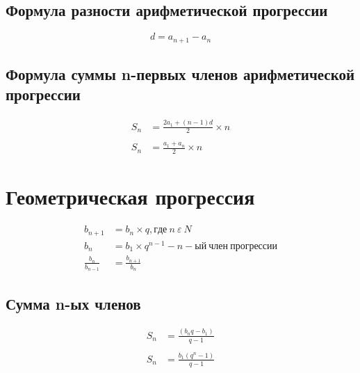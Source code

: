 \documentclass[a4paper,12pt]{article}
\begin{document}
\subsection{Формула разности арифметической прогрессии}

\[ d = a_{n+1} - a_{n} \]

\subsection{Формула суммы n-первых членов арифметической прогрессии}

\begin{align*}
S_{n} &= \frac{2a_{1} + (n - 1)d}{2} \times n \\ \\
S_{n} &= \frac{a_{1} + a_{n}}{2} \times n
\end{align*}

\section{Геометрическая прогрессия}

\begin{align*}
b_{n+1} &= b_{n} \times q, где ~n ~\varepsilon ~N \\
b_{n} &= b_{1} \times q^{n-1} - n-ый ~член ~прогрессии \\
\frac{b_{n}}{b_{n - 1}} &= \frac{b_{n + 1}}{b_{n}}
\end{align*}

\subsection{Сумма n-ых членов}

\begin{align*}
S_{n} &= \frac{(b_{n}q - b_{1})}{q-1} \\ \\
S_{n} &= \frac{b_{1}(q^n - 1)}{q-1}
\end{align*}

\end{document}
